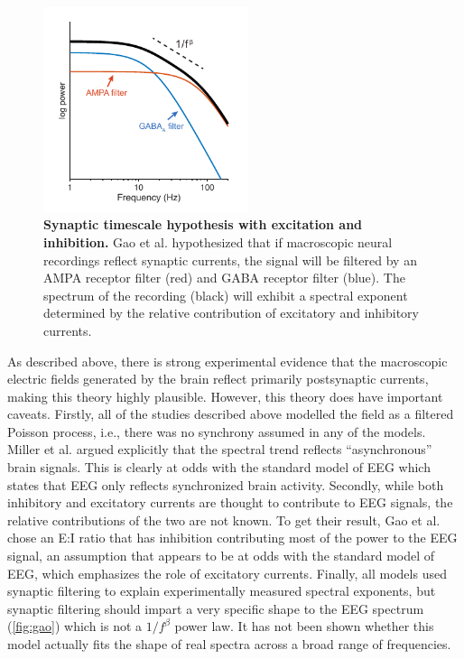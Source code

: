 \begin{figure}
\vspace{-20pt}
\centering
\includegraphics[width=60mm]{Figures/chapter1/EI.pdf}
\vspace{-14pt}
\caption{\textbf{Synaptic timescale hypothesis with excitation and inhibition.} Gao et al. \cite{Gao2017} hypothesized that if macroscopic neural recordings reflect synaptic currents, the signal will be filtered by an AMPA receptor filter (red) and GABA receptor filter (blue). The spectrum of the recording (black) will exhibit a spectral exponent determined by the relative contribution of excitatory and inhibitory currents.}  \label{fig:gao}
\end{figure}

As described above, there is strong experimental evidence that the macroscopic electric fields generated by the brain reflect primarily postsynaptic currents, making this theory highly plausible. However, this theory does have important caveats. Firstly, all of the studies described above modelled the field as a filtered Poisson process, i.e., there was no synchrony assumed in any of the models. Miller et al.\cite{Miller2009} argued explicitly that the spectral trend reflects ``asynchronous'' brain signals. This is clearly at odds with the standard model of EEG which states that EEG only reflects synchronized brain activity. Secondly, while both inhibitory and excitatory currents are thought to contribute to EEG signals, the relative contributions of the two are not known. To get their result, Gao et al. \cite{Gao2017} chose an E:I ratio that has inhibition contributing  most of the power to the EEG signal, an assumption that appears to be at odds with the standard model of EEG, which emphasizes the role of excitatory currents. Finally, all models used synaptic filtering to explain experimentally measured spectral exponents, but synaptic filtering should impart a very specific shape to the EEG spectrum (\autoref{fig:gao}) which is not a $1/f^\beta$ power law. It has not been shown whether this model actually fits the shape of real spectra across a broad range of frequencies.

